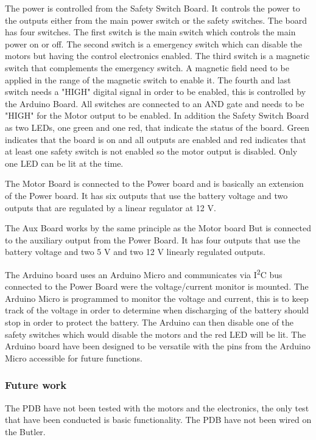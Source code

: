 The power is controlled from the Safety Switch Board. It controls the power to the outputs either from the main power switch or the safety switches. The board has four switches. The first switch is the main switch which controls the main power on or off. The second switch is a emergency switch which can disable the motors but having the control electronics enabled. The third switch is a magnetic switch that complements the emergency switch. A magnetic field need to be applied in the range of the magnetic switch to enable it. The fourth and last switch needs a "HIGH" digital signal in order to be enabled, this is controlled by the Arduino Board.
All switches are connected to an AND gate and needs to be "HIGH" for the Motor output to be enabled. In addition the Safety Switch Board as two LEDs, one green and one red, that indicate the status of the board. Green indicates that the board is on and all outputs are enabled and red indicates that at least one safety switch is not enabled so the motor output is disabled. Only one LED can be lit at the time.

The Motor Board is connected to the Power board and is basically an extension of the Power board. It has six outputs that use the battery voltage and two outputs that are regulated by a linear regulator at 12 V.

The Aux Board works by the same principle as the Motor board But is connected to the auxiliary output from the Power Board. It has four outputs that use the battery voltage and two 5 V and two 12 V linearly regulated outputs.

The Arduino board uses an Arduino Micro and communicates via I\textsuperscript{2}C bus connected to the Power Board were the voltage/current monitor is mounted. The Arduino Micro is programmed to monitor the voltage and current, this is to keep track of the voltage in order to determine when discharging of the battery should stop in order to protect the battery. The Arduino can then disable one of the safety switches which would disable the motors and the red LED will be lit. The Arduino board have been designed to be versatile with the pins from the Arduino Micro accessible for future functions.

\subsubsection{Future work}
The PDB have not been tested with the motors and the electronics, the only test that have been conducted is basic functionality. The PDB have not been wired on the Butler.

